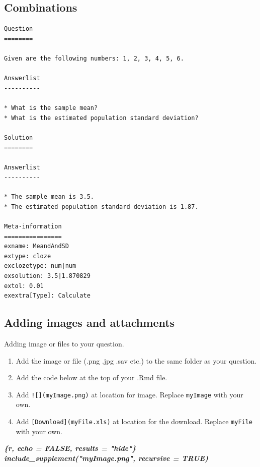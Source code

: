 \documentclass[
]{article}
\newenvironment{Shaded}{\begin{snugshade}}{\end{snugshade}}
\newcommand{\InformationTok}[1]{\textcolor[rgb]{0.56,0.35,0.01}{\textbf{\textit{#1}}}}
\providecommand{\tightlist}{%
  \setlength{\itemsep}{0pt}\setlength{\parskip}{0pt}}
\begin{document}
\hypertarget{combinations}{%
\subsection{Combinations}\label{combinations}}

\begin{verbatim}
Question
========

Given are the following numbers: 1, 2, 3, 4, 5, 6. 

Answerlist
----------

* What is the sample mean? 
* What is the estimated population standard deviation?

Solution
========

Answerlist
----------

* The sample mean is 3.5.
* The estimated population standard deviation is 1.87.

Meta-information
================
exname: MeandAndSD
extype: cloze
exclozetype: num|num
exsolution: 3.5|1.870829
extol: 0.01
exextra[Type]: Calculate
\end{verbatim}

\hypertarget{adding-images-and-attachments}{%
\subsection{Adding images and
attachments}\label{adding-images-and-attachments}}

Adding image or files to your question.

\begin{enumerate}
\def\labelenumi{\arabic{enumi}.}
\tightlist
\item
  Add the image or file (.png .jpg .sav etc.) to the same folder as your
  question.
\item
  Add the code below at the top of your .Rmd file.
\item
  Add \texttt{!{[}{]}(myImage.png)} at location for image. Replace
  \texttt{myImage} with your own.
\item
  Add \texttt{{[}Download{]}(myFile.xls)} at location for the download.
  Replace \texttt{myFile} with your own.
\end{enumerate}

\begin{Shaded}
\begin{Highlighting}[]
\InformationTok{\textasciigrave{}\textasciigrave{}\textasciigrave{}\{r, echo = FALSE, results = "hide"\}}
\InformationTok{include\_supplement("myImage.png", recursive = TRUE)}
\InformationTok{\textasciigrave{}\textasciigrave{}\textasciigrave{}}
\end{Highlighting}
\end{Shaded}
\end{document}
